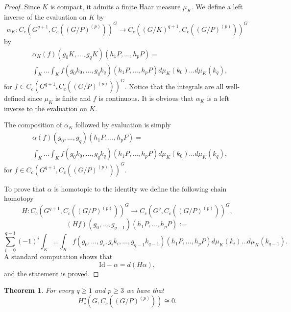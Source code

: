 \documentclass[a4paper]{amsart}
\newtheorem{thm}[lem]{Theorem}
\theoremstyle{definition}
\theoremstyle{remark}
\theoremstyle{TheoremNum}
\begin{document}
\begin{proof}
Since $K$ is compact, it admits a finite Haar measure $\mu_K$. We define a left inverse of the evaluation on $K$ by 
$$
\alpha_K:C_c(G^{q+1},C_c((G/P)^{(p)}))^G\longrightarrow C_c((G/K)^{q+1},C_c((G/P)^{(p)}))^G$$
by
\begin{align*}
&\alpha_K(f)(g_0K,\dots,g_qK)(h_1P,\ldots ,h_pP)=\\
&\int_K \ldots \int_K f(g_0k_0,\ldots,g_qk_q)(h_1P,\ldots,h_pP)d\mu_K(k_0)\ldots d\mu_K(k_q), \end{align*}
for $f\in C_c(G^{q+1},C_c((G/P)^{(p)}))^G$. 
Notice that the integrals are all well-defined since $\mu_K$ is finite and $f$ is continuous. It is obvious that $\alpha_K$ is a left inverse to the evaluation on $K$. 

The composition of  $\alpha_K$ followed by evaluation is simply
\begin{align*}
&\alpha(f)(g_0,\ldots,g_q) (h_1P,\ldots ,h_pP)=\\
&\int_K \ldots \int_K f(g_0k_0,\ldots,g_qk_q)(h_1P,\ldots,h_pP)d\mu_K(k_0)\ldots d\mu_K(k_q), \end{align*}
for $f\in C_c(G^{q+1},C_c((G/P)^{(p)}))^G$. 

To prove that $\alpha$ is homotopic to the identity we define the following chain homotopy
$$
H:C_c(G^{q+1},C_c((G/P)^{(p)}))^G \rightarrow C_c(G^{q},C_c((G/P)^{(p)}))^G,
$$
$$
(H f)(g_0,\ldots,g_{q-1})(h_1P,\ldots,h_pP):=
$$
$$
\sum_{i=0}^{q-1} (-1)^i \int_K \ldots \int_K f(g_0,\ldots,g_i,g_ik_i,\ldots,g_{q-1}k_{q-1})(h_1P,\ldots,h_pP)d\mu_K(k_i)\ldots d\mu_K(k_{q-1}). 
$$
A standard computation shows that 
$$
\mathrm{Id}-\alpha=d(H\alpha),
$$
and the statement is proved. 
\end{proof}

\begin{thm}\label{thm vanishing gp unbounded}
For every $q \geq 1$ and $p \geq 3$ we have that 
$$
H_c^q(G,C_c((G/P)^{(p)})) \cong 0.
$$
\end{thm}
\end{document}
